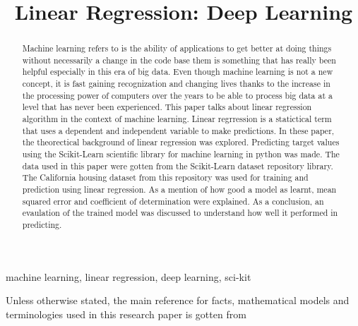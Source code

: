 \documentclass[conference]{IEEEtran}
\begin{document}
\title{Linear Regression: Deep Learning}

\author{
}

\maketitle

\begin{abstract}
Machine learning refers to is the ability of applications to get better at doing things without necessarily a change in the code base them is something that has really been helpful especially in this era of big data.
Even though machine learning is not a new concept, it is fast gaining recognization and changing lives thanks to the increase in the processing power of computers over the years to be able to process big data at a level that has never been experienced. This paper talks about linear regression algorithm in the context of machine learning. Linear regrression is a statictical term that uses a dependent and independent variable to make predictions. In these paper, the theorectical background of linear regression was explored. Predicting target values using the Scikit-Learn scientific library for machine learning  in python was made. The data used in this paper were gotten from the Scikit-Learn dataset repository library. The California housing dataset from this repository was used for training and prediction using linear regression. As a mention of how good a model as learnt, mean squared error and coefficient of determination were explained. As a conclusion, an evaulation of the trained model was discussed to understand how well it performed in predicting.
\end{abstract}
\begin{IEEEkeywords}
machine learning, linear regression, deep learning, sci-kit
\end{IEEEkeywords}
Unless otherwise stated, the main reference for facts, mathematical models and terminologies used in this research paper is gotten from \cite{massaron2016regression}
\end{document}
